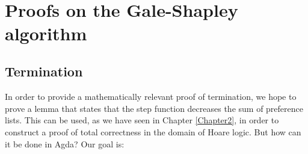 {\begin{code}%
\>[0]\AgdaSymbol{\{-\#}\AgdaSpace{}%
\AgdaSpace{}%
\AgdaSymbol{\#-\}}\<%
\\
\>[0]\AgdaSpace{}%
\AgdaSymbol{:}\AgdaSpace{}%
\AgdaSymbol{(}\AgdaSpace{}%
\AgdaSymbol{:}\AgdaSpace{}%
\AgdaSymbol{)}\AgdaSpace{}%
\AgdaSpace{}%
\<%
\\
\>[0]%
\>[928I]\AgdaSymbol{(}\AgdaSpace{}%
\AgdaSpace{}%
\AgdaInductiveConstructor{[]}\AgdaSpace{}%
\AgdaSpace{}%
\AgdaSpace{}%
\AgdaSpace{}%
\AgdaSpace{}%
\AgdaSymbol{)}\AgdaSpace{}%
\AgdaSymbol{=}\<%
\\
\>[.][@{}l@{}]\<[928I]%
\>[9]\AgdaSpace{}%
\AgdaSpace{}%
\AgdaInductiveConstructor{[]}\AgdaSpace{}%
\AgdaSpace{}%
\AgdaSpace{}%
\AgdaSpace{}%
\AgdaSpace{}%
\<%
\\
\>[0]\AgdaSpace{}%
\AgdaSpace{}%
\AgdaSymbol{=}\AgdaSpace{}%
\AgdaSpace{}%
\AgdaSymbol{(}\AgdaSpace{}%
\AgdaSymbol{)}\<%
\end{code}

\section{Proofs on the Gale-Shapley algorithm}

\subsection{Termination}

In order to provide a mathematically relevant proof of termination, we hope to prove a lemma that states that the step function decreases the sum of preference lists. This can be used, as we have seen in Chapter \ref{Chapter2}, in order to construct a proof of total correctness in the domain of Hoare logic. But how can it be done in Agda? Our goal is:

}
